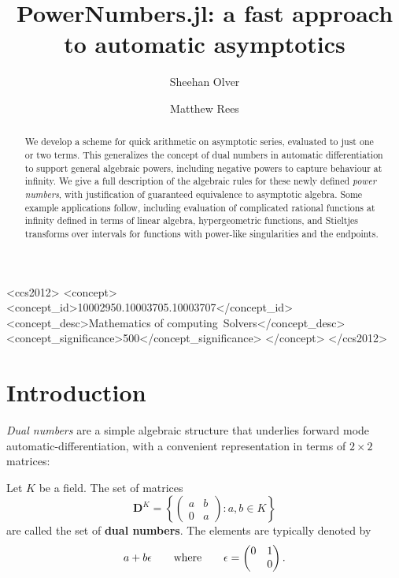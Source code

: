 \documentclass[acmsmall]{acmart}
\begin{document}
	
\title{PowerNumbers.jl: a fast approach to automatic asymptotics}

\author{Sheehan Olver}

\author{Matthew Rees}

\begin{abstract}
	We develop a scheme for quick arithmetic on asymptotic series, evaluated to just one or two terms. This generalizes the concept of dual numbers in automatic differentiation to support general algebraic powers, including negative powers to capture behaviour at infinity.  We give a full description of the algebraic rules for these newly defined {\it power numbers}, with justification of guaranteed equivalence to asymptotic algebra. Some example applications follow, including evaluation of complicated rational functions at infinity defined in terms of linear algebra, hypergeometric functions, and Stieltjes transforms over intervals for functions with power-like singularities and the endpoints.
\end{abstract}

\begin{CCSXML}
	<ccs2012>
	<concept>
	<concept_id>10002950.10003705.10003707</concept_id>
	<concept_desc>Mathematics of computing~Solvers</concept_desc>
	<concept_significance>500</concept_significance>
	</concept>
	</ccs2012>
\end{CCSXML}



\maketitle

\section{Introduction}

{\it Dual numbers} are a simple algebraic structure that underlies forward mode automatic-differentiation, with a convenient representation in terms of $2 \times 2$ matrices:

\begin{definition}
Let $K$ be a field. The set of matrices
$$\mathbf{D}^K = \left\{\begin{pmatrix}a & b \\ 0 & a \end{pmatrix} : a,b \in K\right\}$$ 
are called the set of \textbf{dual numbers}. The elements are typically denoted by
$$
a + b \epsilon \qquad \hbox{where} \qquad \epsilon = \begin{pmatrix} 0 & 1 \\ & 0 \end{pmatrix}.
$$
\end{definition}
\end{document}
